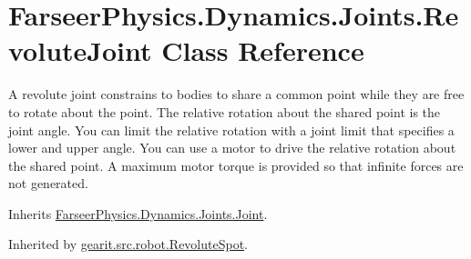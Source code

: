 \hypertarget{class_farseer_physics_1_1_dynamics_1_1_joints_1_1_revolute_joint}{\section{Farseer\+Physics.\+Dynamics.\+Joints.\+Revolute\+Joint Class Reference}
\label{class_farseer_physics_1_1_dynamics_1_1_joints_1_1_revolute_joint}
}


A revolute joint constrains to bodies to share a common point while they are free to rotate about the point. The relative rotation about the shared point is the joint angle. You can limit the relative rotation with a joint limit that specifies a lower and upper angle. You can use a motor to drive the relative rotation about the shared point. A maximum motor torque is provided so that infinite forces are not generated.  




Inherits \hyperlink{class_farseer_physics_1_1_dynamics_1_1_joints_1_1_joint}{Farseer\+Physics.\+Dynamics.\+Joints.\+Joint}.



Inherited by \hyperlink{classgearit_1_1src_1_1robot_1_1_revolute_spot}{gearit.\+src.\+robot.\+Revolute\+Spot}.

